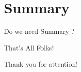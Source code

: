 \documentclass[aspectratio=169]{beamer}
\begin{document}
\section*{Summary}

\begin{frame}{Do we need Summary ?}
	
\end{frame}

\begin{frame}{That's All Folks!}
	\begin{center}
     {\huge	Thank you for attention! }
	\end{center}
	
\end{frame}
\end{document}
